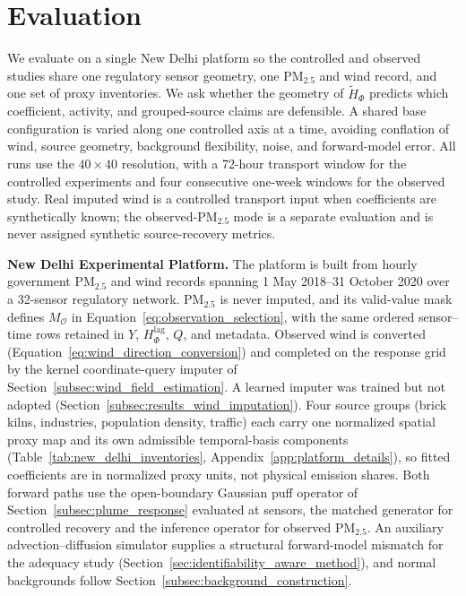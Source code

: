 \section{Evaluation}
\label{sec:evaluation}

We evaluate on a single New Delhi platform so the controlled and observed studies
share one regulatory sensor geometry, one PM\(_{2.5}\) and wind record, and one set
of proxy inventories.  We ask whether the geometry of \(\widetilde H_\Phi\) predicts
which coefficient, activity, and grouped-source claims are defensible.  A shared
base configuration is varied along one controlled axis at a time, avoiding
conflation of wind, source geometry, background flexibility, noise, and
forward-model error.  All runs use the \(40\times40\)
resolution, with a 72-hour transport window for the controlled experiments and
four consecutive one-week windows for the observed study.  Real imputed wind is a
controlled transport input when coefficients are synthetically known; the
observed-PM\(_{2.5}\) mode is a separate evaluation and is never assigned synthetic
source-recovery metrics.

\noindent\textbf{New Delhi Experimental Platform.}
The platform is built from hourly government PM\(_{2.5}\) and wind records
\citep{cpcb,cpcb_portal} spanning 1 May 2018--31 October 2020 over a 32-sensor
regulatory network.  PM\(_{2.5}\) is never imputed, and its valid-value mask defines
\(M_{\mathcal O}\) in Equation~\ref{eq:observation_selection}, with the same
ordered sensor--time rows retained in \(Y\), \(H_\Phi^{\mathrm{lag}}\), \(Q\), and
metadata.  Observed wind is converted (Equation~\ref{eq:wind_direction_conversion})
and completed on the response grid by the kernel coordinate-query imputer of
Section~\ref{subsec:wind_field_estimation}\label{subsec:new_delhi_wind}.  A learned
imputer was trained but not adopted (Section~\ref{subsec:results_wind_imputation}).
Four source groups (brick kilns, industries, population density, traffic) each
carry one normalized spatial proxy map and its own admissible temporal-basis
components (Table~\ref{tab:new_delhi_inventories},
Appendix~\ref{app:platform_details}), so fitted coefficients are in normalized
proxy units, not physical emission shares.  Both forward paths use the
open-boundary Gaussian puff operator of Section~\ref{subsec:plume_response}
evaluated at sensors, the matched generator for controlled recovery and the
inference operator for observed PM\(_{2.5}\).  An auxiliary advection--diffusion
simulator supplies a structural forward-model mismatch for the adequacy study
(Section~\ref{sec:identifiability_aware_method}), and normal backgrounds follow
Section~\ref{subsec:background_construction}.

